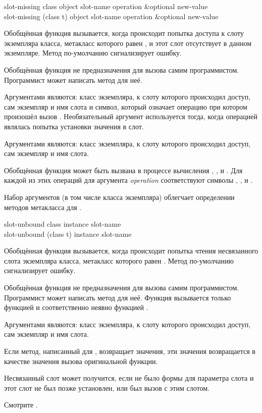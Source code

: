 \begin{defun}
slot-missing class object slot-name operation &optional new-value \\
slot-missing (class t) object slot-name operation &optional new-value

Обобщённая функция  вызывается, когда происходит попытка
доступа к слоту экземпляра класса, метакласс которого равен
, и этот слот отсутствует в данном экземпляре.
Метод по-умолчанию сигнализирует ошибку.

Обобщённая функция  не предназначения для вызова самим
программистом. Программист может написать метод для неё. 

Аргументами  являются: класс экземпляра, к слоту которого
происходил доступ, сам экземпляр и имя слота и символ, который означает операцию
при котором произошёл вызов . Необязательный аргумент
 используется тогда, когда операцией являлась попытка
установки значения в слот.

Аргументами  являются: класс экземпляра, к слоту которого
происходил доступ, сам экземпляр и имя слота.

Обобщённая функция  может быть вызвана в процессе вычисления
, ,  и
. Для каждой из этих операций для
аргумента \emph{operation} соответствуют символы , ,
 и .

Набор аргументов (в том числе класса экземпляра) облегчает
определении методов метакласса для .
\end{defun}


\begin{defun}
slot-unbound class instance slot-name \\
slot-unbound (class t) instance slot-name

Обобщённая функция  вызывается, когда происходит попытка
чтения несвязанного слота экземпляра класса, метакласс которого равен
.
Метод по-умолчанию сигнализирует ошибку.

Обобщённая функция  не предназначения для вызова самим
программистом. Программист может написать метод для неё. Функция
 вызывается только функцией  и
соответственно неявно функцией .

Аргументами  являются: класс экземпляра, к слоту которого
происходил доступ, сам экземпляр и имя слота.

Если метод, написанный для , возвращает значения, эти значения
возвращается в качестве значения вызова оригинальной функции.

Несвязанный слот может получится, если не было формы для параметра слота
 и этот слот не был позже установлен, или был вызов
 с этим слотом.

Смотрите .
\end{defun}


